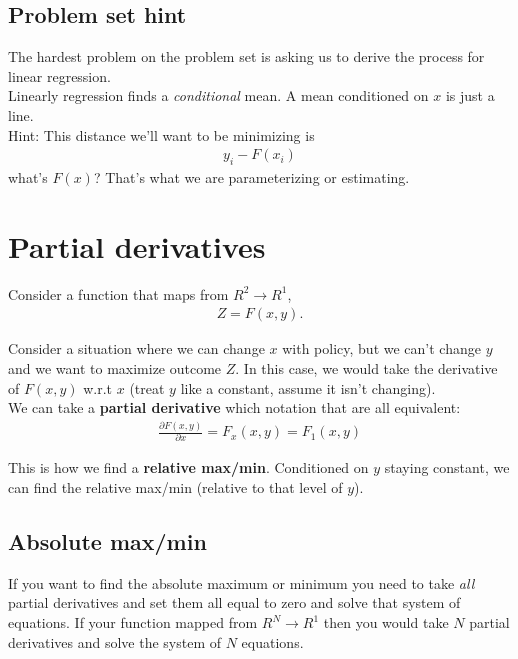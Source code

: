 \documentclass{article}
\begin{document}
\subsection{Problem set hint}
The hardest problem on the problem set is asking us to derive the process for linear regression. \\

Linearly regression finds a \textit{conditional} mean. A mean conditioned on $x$ is just a line. \\

Hint: This distance we'll want to be minimizing is 
\begin{align}
    y_i - F(x_i)
\end{align}
what's $F(x)$? That's what we are parameterizing or estimating. 

\section{Partial derivatives}
Consider a function that maps from $R^2 \to R^1$, 
\begin{align}
    Z = F(x, y).
\end{align}

Consider a situation where we can change $x$ with policy, but we can't change $y$ and we want to maximize outcome $Z.$ In this case, we would take the derivative of $F(x,y)$ w.r.t $x$ (treat $y$ like a constant, assume it isn't changing). \\

We can take a \textbf{partial derivative} which notation that are all equivalent: 
\begin{align}
    \frac{\partial F(x,y)}{\partial x} = F_x(x,y) = F_1(x,y)
\end{align}

This is how we find a \textbf{relative max/min}. Conditioned on $y$ staying constant, we can find the relative max/min (relative to that level of $y$). 

\subsection{Absolute max/min}
If you want to find the absolute maximum or minimum you need to take \textit{all} partial derivatives and set them all equal to zero and solve that system of equations. If your function mapped from $R^N \to R^1$ then you would take $N$ partial derivatives and solve the system of $N$ equations. 
\end{document}
